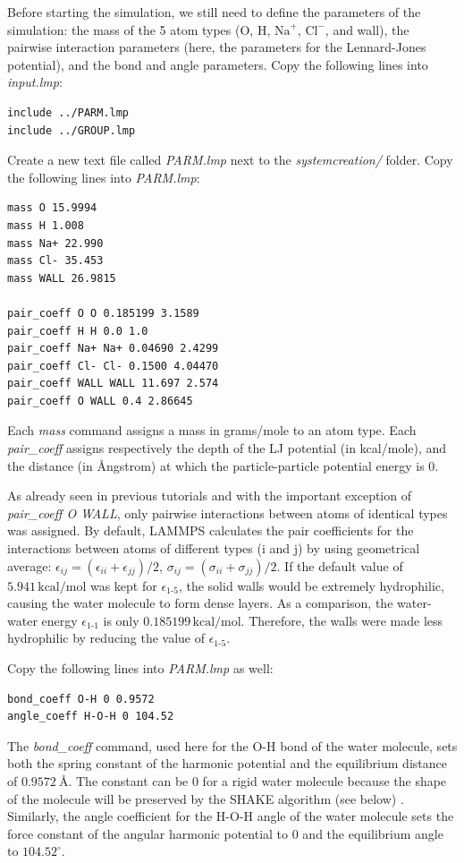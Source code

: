 \documentclass[9pt,tutorial]{livecoms}
\begin{document}
Before starting the simulation, we still need to define the parameters of the
simulation: the mass of the 5 atom types (O, H, $\text{Na}^+$, $\text{Cl}^-$,
and wall), the pairwise interaction parameters (here, the parameters for the
Lennard-Jones potential), and the bond and angle parameters. Copy the following
lines into \textit{input.lmp}:
{\normalsize \begin{verbatim}
include ../PARM.lmp
include ../GROUP.lmp
\end{verbatim}}
Create a new text file called \textit{PARM.lmp} next to the \textit{systemcreation/}
folder. Copy the following lines into \textit{PARM.lmp}:
{\normalsize \begin{verbatim}
mass O 15.9994
mass H 1.008
mass Na+ 22.990
mass Cl- 35.453
mass WALL 26.9815

pair_coeff O O 0.185199 3.1589
pair_coeff H H 0.0 1.0
pair_coeff Na+ Na+ 0.04690 2.4299
pair_coeff Cl- Cl- 0.1500 4.04470
pair_coeff WALL WALL 11.697 2.574
pair_coeff O WALL 0.4 2.86645
\end{verbatim}}
Each \textit{mass} command assigns a mass in grams/mole to an atom type.
Each \textit{pair\_coeff} assigns respectively the depth of the LJ potential
(in kcal/mole), and the distance (in Ångstrom) at which the particle-particle
potential energy is 0.

As already seen in previous tutorials and with the important exception of
\textit{pair\_coeff O WALL}, only pairwise interactions between atoms of identical
types was assigned. By default, LAMMPS calculates the pair coefficients for the
interactions between atoms of different types (i and j) by using geometrical average:
$\epsilon_{ij} = (\epsilon_{ii} + \epsilon_{jj})/2$,  $\sigma_{ij} = (\sigma_{ii} + \sigma_{jj})/2$.
If the default value of $5.941\,\text{kcal/mol}$ was kept for $\epsilon_\text{1-5}$, the solid
walls would be extremely hydrophilic, causing the water molecule to form dense layers. As a
comparison, the water-water energy $\epsilon_\text{1-1}$ is only $0.185199\,\text{kcal/mol}$.
Therefore, the walls were made less hydrophilic by reducing the value of $\epsilon_\text{1-5}$.

Copy the following lines into \textit{PARM.lmp} as well:
{\normalsize \begin{verbatim}
bond_coeff O-H 0 0.9572
angle_coeff H-O-H 0 104.52
\end{verbatim}}
The \textit{bond\_coeff} command, used here for the O-H bond of the water
molecule, sets both the spring constant of the harmonic potential and the
equilibrium distance of $0.9572~\text{\AA{}}$. The constant can be 0 for a
rigid water molecule because the shape of the molecule will be preserved by
the SHAKE algorithm (see below) \cite{ryckaert1977numerical, andersen1983rattle}.
Similarly, the angle coefficient for the H-O-H angle of the water molecule sets
the force constant of the angular harmonic potential to 0 and the equilibrium
angle to $104.52^\circ$.
\end{document}
